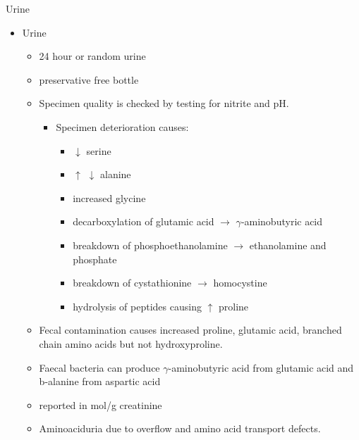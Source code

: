\documentclass[presentation, smaller]{beamer}
\begin{document}
\begin{frame}[label={sec:orgheadline7}]{Urine}
\begin{itemize}
\item Urine
\begin{itemize}
\item 24 hour or random urine
\item preservative free bottle
\item Specimen quality is checked by testing for nitrite and pH.
\begin{itemize}
\item Specimen deterioration causes:
\begin{itemize}
\item \(\downarrow\) serine
\item \(\uparrow\) \(\downarrow\) alanine
\item increased glycine
\item decarboxylation of glutamic acid \(\to\) \(\gamma\)-aminobutyric acid
\item breakdown of phosphoethanolamine \(\to\) ethanolamine and phosphate
\item breakdown of cystathionine \(\to\) homocystine
\item hydrolysis of peptides causing \(\uparrow\) proline
\end{itemize}
\end{itemize}
\item Fecal contamination causes increased proline, glutamic acid, branched chain amino acids but not hydroxyproline.
\item Faecal bacteria can produce \(\gamma\)-aminobutyric acid from glutamic acid and b-alanine from aspartic acid
\item reported in \textmu{}mol/g creatinine
\item Aminoaciduria due to overflow and amino acid transport defects.
\end{itemize}
\end{itemize}
\end{frame}
\end{document}
